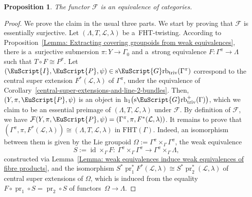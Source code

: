 \documentclass[pdftex]{sigma}
\numberwithin{equation}{section}
\newtheorem{Proposition}[Theorem]{Proposition}
 { \theoremstyle{definition}
\newtheorem{Definition}[Theorem]{Definition}
\newtheorem{Example}[Theorem]{Example}
\newtheorem{Remark}[Theorem]{Remark} }
\def\mathscr#1{\EuScript{#1}}
\def\hc#1{\mathrm{h}_{#1}}
\newcommand{\pr}{\operatorname{pr}}
\newcommand{\id}{\operatorname{id}}
\newcommand{\Grbtriv}{\mathscr{G}\mathrm{rb}_{\mathrm{triv}}}
\newcommand{\sGrbtriv}{\mathrm{s}\Grbtriv}
\begin{document}
\begin{Proposition}
\label{The FHT functor: essential surjectivity}
\label{The FHT functor: fullness}
\label{The FHT functor: faithfulness}
The functor $\mathcal{F}$ is an equivalence of categories.
\end{Proposition}
\begin{proof}
We prove the claim in the usual three parts. We start by proving that $\mathcal{F}$ is essentially surjective.
 Let $(\Lambda, T,\mathcal{L},\lambda)$ be a~FHT-twisting. According to Proposition~\ref{Lemma: Extracting covering groupoids from weak equivalences}, there is a~surjective submersion $\pi\colon Y \to \Gamma_0$ and a~strong equivalence $F \colon \Gamma^{\pi} \to \Lambda $ such that $T \circ F \cong P^{\pi}$.
 Let $(\mathscr{I},\mathscr{P},\psi)\in \sGrbtriv(\Gamma^{\pi})$ correspond to the central super extension $F^{*}(\mathcal{L},\lambda)$ of $\Gamma^{\pi}$, under the equivalence of Corollary~\ref{central-super-extensions-and-line-2-bundles}.
 Then, $(Y,\pi,\mathscr{P},\psi)$ is an object in $\hc 1\bigl(\sGrbtriv^{+}(\Gamma)\bigr)$, which we claim to be an essential preimage of $(\Lambda, T,\mathcal{L},\lambda)$ under $\mathcal{F}$.
 By definition of $\mathcal{F}$, we have $\mathcal{F}(Y,\pi,\mathscr{P},\psi)=(\Gamma^{\pi},\pi,F^*(\mathcal{L},\lambda))$. It remains to prove that
 $(\Gamma^{\pi},\pi,F^*(\mathcal{L},\lambda)) \cong (\Lambda, T,\mathcal{L},\lambda)$ in $\mathrm{FHT}(\Gamma)$. Indeed, an isomorphism between them is given by the Lie groupoid $\Omega := \Gamma^\pi \times_\Gamma \Gamma^{\pi}$,
 the weak equivalence
 \begin{equation*}
 S:= \id \times_{\Gamma} F \colon \ \Gamma^\pi \times_\Gamma \Gamma^{\pi} \to \Gamma^\pi \times_\Gamma \Lambda,
 \end{equation*}
 constructed via Lemma~\ref{Lemma: weak equivalences induce weak equivalences of fibre products},
 and the isomorphism
$
 S^*\pr_{1}^* F^*(\mathcal{L},\lambda) \cong S^*\pr_{2}^* (\mathcal{L},\lambda)
$
 of central super extensions of $\Omega$, which is induced from the equality
$F \circ \pr_1 \circ S = \pr_2 \circ S$ of functors~${\Omega \to \Lambda}$.


\end{proof}
\end{document}
